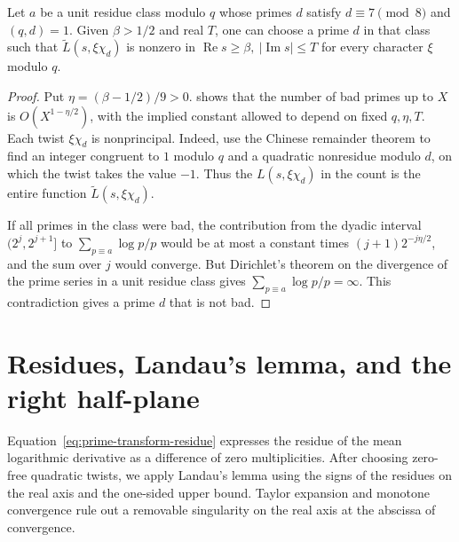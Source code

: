 \begin{lemma}
\label{lem:twist-choice}
\emitthmsource
Let $a$ be a unit residue class modulo $q$ whose primes $d$ satisfy $d\equiv7\pmod8$ and $(q,d)=1$. Given $\beta>1/2$ and real $T$, one can choose a prime $d$ in that class such that $\widetilde L(s,\xi\chi_d)$ is nonzero in $\operatorname{Re}s\ge\beta,\ |\operatorname{Im}s|\le T$ for every character $\xi$ modulo $q$.
\end{lemma}
\begin{proof}
Put $\eta=(\beta-1/2)/9>0$.  shows that the number of bad primes up to $X$ is $O(X^{1-\eta/2})$, with the implied constant allowed to depend on fixed $q,\eta,T$. Each twist $\xi\chi_d$ is nonprincipal. Indeed, use the Chinese remainder theorem to find an integer congruent to $1$ modulo $q$ and a quadratic nonresidue modulo $d$, on which the twist takes the value $-1$. Thus the $L(s,\xi\chi_d)$ in the count is the entire function $\widetilde L(s,\xi\chi_d)$.

If all primes in the class were bad, the contribution from the dyadic interval $(2^j,2^{j+1}]$ to $\sum_{p\equiv a}\log p/p$ would be at most a constant times $(j+1)2^{-j\eta/2}$, and the sum over $j$ would converge. But Dirichlet's theorem on the divergence of the prime series in a unit residue class gives $\sum_{p\equiv a}\log p/p=\infty$. This contradiction gives a prime $d$ that is not bad.
\end{proof}

\section{Residues, Landau's lemma, and the right half-plane}
\label{sec:landau-criterion}

Equation~\eqref{eq:prime-transform-residue} expresses the residue of the mean logarithmic derivative as a difference of zero multiplicities. After choosing zero-free quadratic twists, we apply Landau's lemma using the signs of the residues on the real axis and the one-sided upper bound. Taylor expansion and monotone convergence rule out a removable singularity on the real axis at the abscissa of convergence.

